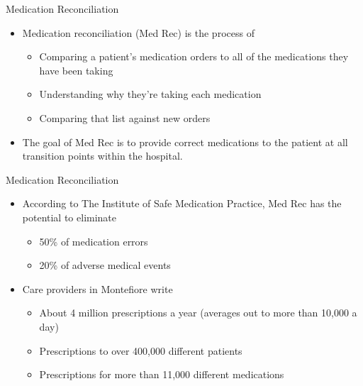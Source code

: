 \documentclass[10pt]{beamer}
\begin{document}
\begin{frame}{Medication Reconciliation}
	\begin{itemize}
		\item Medication reconciliation (Med Rec) is the process of
		\begin{itemize}
			\item Comparing a patient's medication orders to all of the medications they have been taking
			\item Understanding why they're taking each medication
			\item Comparing that list against new orders
		\end{itemize} 
		\item The goal of Med Rec is to provide correct medications to the patient at all transition points within the hospital.		   
	\end{itemize}
\end{frame}

\begin{frame}{Medication Reconciliation}
	\begin{itemize}
		\item According to The Institute of Safe Medication Practice, Med Rec has the potential to eliminate
		\begin{itemize}
			\item 50\% of medication errors
			\item 20\% of adverse medical events
		\end{itemize}
		\item Care providers in Montefiore write 
		\begin{itemize}
			\item About 4 million prescriptions a year (averages out to more than 10,000 a day)
			\item Prescriptions to over 400,000 different patients
			\item Prescriptions for more than 11,000 different medications
		\end{itemize}		   
	\end{itemize}
\end{frame}
\end{document}
